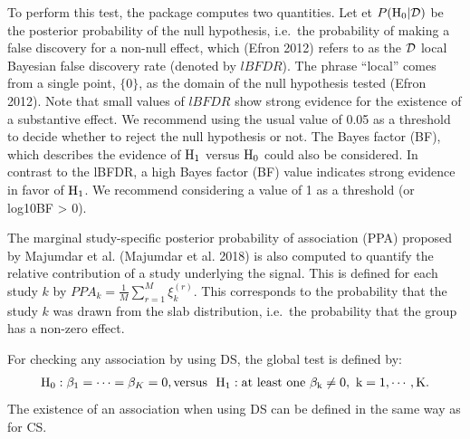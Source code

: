 To perform this test, the package computes two quantities. Let et \(P(\rm{H}_0|\cal{D})\) be the posterior probability of the null hypothesis, i.e.~the probability of making a false discovery for a non-null effect, which (Efron 2012) refers to as the \(\cal{D}\) local Bayesian false discovery rate (denoted by \(lBFDR\)). The phrase ``local'' comes from a single point, \(\{0\}\), as the domain of the null hypothesis tested (Efron 2012). Note that small values of \(lBFDR\) show strong evidence for the existence of a substantive effect.
We recommend using the usual value of 0.05 as a threshold to
decide whether to reject the null hypothesis or not.
The Bayes factor (BF), which describes the evidence of \(\rm{H}_1\) versus \(\rm{H}_0\) could also be considered.
In contrast to the lBFDR, a high Bayes factor (BF) value indicates strong evidence in favor of \(\rm{H}_1\). We recommend considering a value of 1 as a threshold (or log10BF \textgreater{} 0).

The marginal study-specific posterior probability of association (PPA) proposed by Majumdar et al. (Majumdar et al. 2018) is also computed to quantify the relative contribution of a study underlying the signal.
This is defined for each study \(k\) by \({PPA _k} = \frac{1}{M}\sum\limits_{r = 1}^M {\xi _k^{(r)}}\).
This corresponds to the probability that the study \(k\) was drawn from the slab distribution, i.e.~the probability that the group has a non-zero effect.

For checking any association by using DS, the global test is defined by:
\begin{eqnarray}\label{testD}
\begin{array}{l}
{\rm{H}_0}:{\beta _1} = \cdots = {\beta _K} = 0, \rm{versus~~}
{H_1}:{\rm{at~ least ~one~}}{\beta _k} \ne 0,{\rm{ ~}}k = 1,\cdots,K.
\end{array}
\end{eqnarray}
The existence of an association when using DS can be defined in the same way as for CS.

